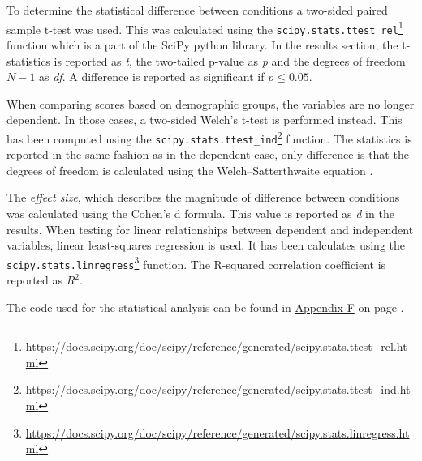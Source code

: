 To determine the statistical difference between conditions a two-sided paired sample t-test was used. This was calculated using the \texttt{scipy.stats.ttest\_rel}\footnote{\url{https://docs.scipy.org/doc/scipy/reference/generated/scipy.stats.ttest_rel.html}} function which is a part of the SciPy python library. In the results section, the t-statistics is reported as \emph{t}, the two-tailed p-value as \emph{p} and the degrees of freedom $N-1$ as \emph{df}. A difference is reported as significant if $p\le 0.05$.

When comparing scores based on demographic groups, the variables are no longer dependent. In those cases, a two-sided Welch’s t-test is performed instead. This has been computed using the \texttt{scipy.stats.ttest\_ind}\footnote{\url{https://docs.scipy.org/doc/scipy/reference/generated/scipy.stats.ttest_ind.html}} function. The statistics is reported in the same fashion as in the dependent case, only difference is that the degrees of freedom is calculated using the Welch–Satterthwaite equation \citep{Allwood2008}.

The \emph{effect size}, which describes the magnitude of difference between conditions was calculated using the Cohen's d formula. This value is reported as \emph{d} in the results. When testing for linear relationships between dependent and independent variables, linear least-squares regression is used. It has been calculates using the \texttt{scipy.stats.linregress}\footnote{\url{https://docs.scipy.org/doc/scipy/reference/generated/scipy.stats.linregress.html}} function. The R-squared correlation coefficient is reported as $R^2$.

The code used for the statistical analysis can be found in \hyperref[appAnalysis]{Appendix F} on page \pageref{appAnalysis}.